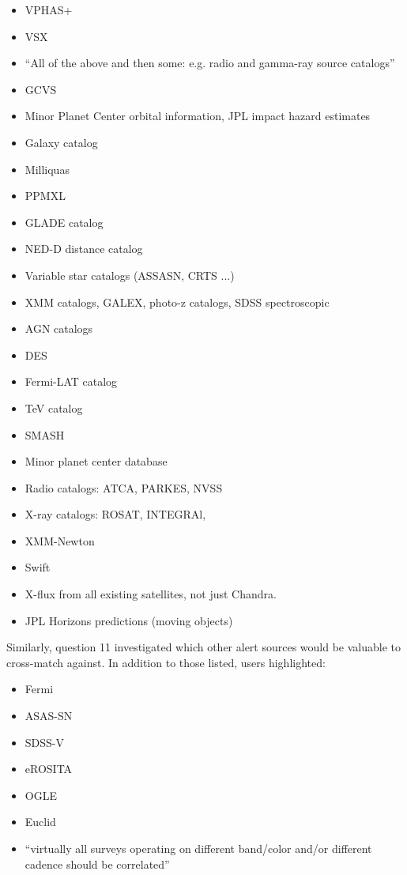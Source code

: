 \documentclass{article}
\begin{document}
\begin{itemize}
\item VPHAS+
\item VSX
\item ``All of the above and then some: e.g. radio and gamma-ray source catalogs''
\item GCVS
\item Minor Planet Center orbital information, JPL impact hazard estimates
\item Galaxy catalog
\item Milliquas
\item PPMXL
\item GLADE catalog
\item NED-D distance catalog
\item Variable star catalogs (ASSASN, CRTS ...)
\item XMM catalogs, GALEX, photo-z catalogs, SDSS spectroscopic
\item AGN catalogs
\item DES
\item Fermi-LAT catalog
\item TeV catalog
\item SMASH
\item Minor planet center database
\item Radio catalogs: ATCA, PARKES, NVSS
\item X-ray catalogs: ROSAT, INTEGRAl, 
\item XMM-Newton
\item Swift
\item X-flux from all existing satellites, not just Chandra.
\item JPL Horizons predictions (moving objects)
\end{itemize}

Similarly, question 11 investigated which other alert sources would be valuable to cross-match against.  In addition to those listed, users highlighted:

\begin{itemize}
\item Fermi
\item ASAS-SN
\item SDSS-V
\item eROSITA
\item OGLE
\item Euclid
\item ``virtually all surveys operating on different band/color and/or different cadence should be correlated''
\end{itemize}
\end{document}
